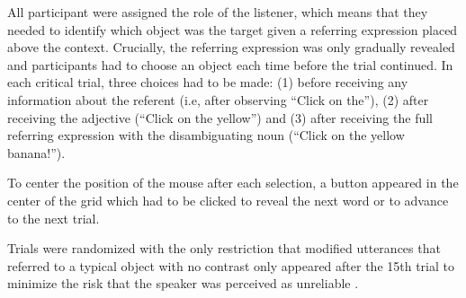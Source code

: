 \documentclass[10pt,letterpaper]{article}
\begin{document}
All participant were assigned the role of the listener, which means that they needed to identify which object was the target given a referring expression placed above the context. Crucially, the referring expression was only gradually revealed and participants had to choose an object each time before the trial continued. In each critical trial, three choices had to be made: (1) before receiving any information about the referent (i.e, after observing ``Click on the''), (2) after receiving the adjective (``Click on the yellow'') and (3) after receiving the full referring expression with the disambiguating noun (``Click on the yellow banana!''). 

To center the position of the mouse after each selection, a button appeared in the center of the grid which had to be clicked to reveal the next word or to advance to the next trial. 


Trials were randomized with the only restriction that modified utterances that referred to a typical object with no contrast only appeared after the 15th trial to minimize the risk that the speaker was perceived as unreliable \cite{Grodner:2011}.
\end{document}
